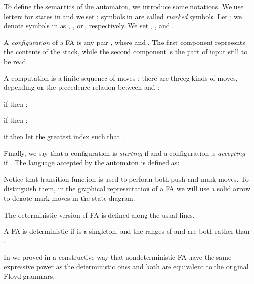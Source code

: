 \documentclass[10pt,a4paper,runningheads]{llncs}
\begin{document}
To define the semantics of the automaton, we introduce some notations.
We use letters  for states in  and we set
; symbols in 
are called {\em marked} symbols.  Let ; we denote symbols in  as
, , or , respectively.  We set
, , and .

A \emph{configuration} of a FA is any pair 
,
where 
and .
The first component represents
the contents of the stack, while the second component is the part of input still
to be read.

A computation is a finite sequence of moves ; there are threeg kinds of moves, depending on the precedence
relation between  and :

\smallskip

if  then 
;
\smallskip

if  then
;

\smallskip

if  then
let  the greatest index such that
. 


\smallskip

Finally, we say that a configuration  is {\em
  starting} if  and a configuration  is
{\em accepting} if .  The language accepted by the
automaton is defined as:







Notice that transition function  is used to
perform both push and mark moves.  To distinguish them, 
in the graphical
representation of a FA we will use a solid arrow to denote mark moves
in the state diagram.


The deterministic version of FA is defined along the usual lines.

\begin{definition}
  A FA is deterministic if  is a singleton, and the ranges of
   and  are both 
  rather than .
\end{definition}

In \cite{LMP10} we proved in a constructive way that nondeterministic FA have the same
expressive power as the deterministic ones and both are equivalent to the original Floyd grammars. 
\end{document}
